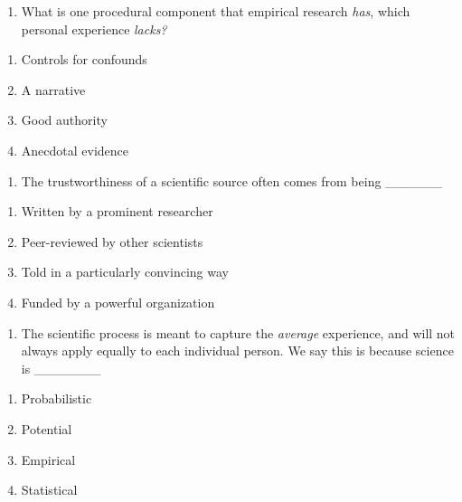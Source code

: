\documentclass[
  12pt,
  letterpaper,
  DIV=11,
  numbers=noendperiod]{scrartcl}
\providecommand{\tightlist}{%
  \setlength{\itemsep}{0pt}\setlength{\parskip}{0pt}}\usepackage{longtable,booktabs,array}
\begin{document}
\newpage{}

\begin{enumerate}
\def\labelenumi{\arabic{enumi}.}
\setcounter{enumi}{5}
\tightlist
\item
  What is one procedural component that empirical research \emph{has},
  which personal experience \emph{lacks?}
\end{enumerate}

\begin{enumerate}
\def\labelenumi{\alph{enumi}.}
\tightlist
\item
  Controls for confounds
\item
  A narrative
\item
  Good authority
\item
  Anecdotal evidence
\end{enumerate}

\begin{enumerate}
\def\labelenumi{\arabic{enumi}.}
\setcounter{enumi}{6}
\tightlist
\item
  The trustworthiness of a scientific source often comes from being
  \_\_\_\_\_\_
\end{enumerate}

\begin{enumerate}
\def\labelenumi{\alph{enumi}.}
\tightlist
\item
  Written by a prominent researcher
\item
  Peer-reviewed by other scientists
\item
  Told in a particularly convincing way
\item
  Funded by a powerful organization
\end{enumerate}

\begin{enumerate}
\def\labelenumi{\arabic{enumi}.}
\setcounter{enumi}{7}
\tightlist
\item
  The scientific process is meant to capture the \emph{average}
  experience, and will not always apply equally to each individual
  person. We say this is because science is \_\_\_\_\_\_\_
\end{enumerate}

\begin{enumerate}
\def\labelenumi{\alph{enumi}.}
\tightlist
\item
  Probabilistic
\item
  Potential
\item
  Empirical
\item
  Statistical
\end{enumerate}
\end{document}
